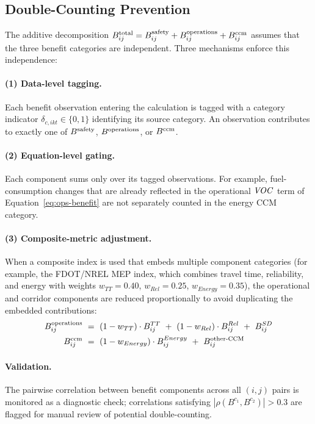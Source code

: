 \subsection{Double-Counting Prevention}

The additive decomposition $B^{\mathrm{total}}_{ij} = B^{\mathrm{safety}}_{ij} + B^{\mathrm{operations}}_{ij} +
B^{\mathrm{ccm}}_{ij}$ assumes that the three benefit categories are independent. Three
mechanisms enforce this independence:

\paragraph{(1) Data-level tagging.} Each benefit observation entering the
calculation is tagged with a category indicator
$\delta_{c,ikt} \in \{0, 1\}$ identifying its source category. An observation
contributes to exactly one of $B^{\mathrm{safety}}$, $B^{\mathrm{operations}}$, or $B^{\mathrm{ccm}}$.

\paragraph{(2) Equation-level gating.} Each component sums only over its
tagged observations. For example, fuel-consumption changes that are already
reflected in the operational $\mathit{VOC}$ term of Equation~\ref{eq:ops-benefit}
are not separately counted in the energy CCM category.

\paragraph{(3) Composite-metric adjustment.} When a composite index is used
that embeds multiple component categories (for example, the FDOT/NREL MEP
index, which combines travel time, reliability, and energy with weights
$w_{TT} = 0.40$, $w_{Rel} = 0.25$, $w_{Energy} = 0.35$), the operational and
corridor components are reduced proportionally to avoid duplicating the
embedded contributions:
\begin{align*}
B^{\mathrm{operations}}_{ij} \ &=\ (1 - w_{TT}) \cdot B_{ij}^{TT}
            \ +\ (1 - w_{Rel}) \cdot B_{ij}^{Rel}
            \ +\ B_{ij}^{SD} \\
B^{\mathrm{ccm}}_{ij} \ &=\ (1 - w_{Energy}) \cdot B_{ij}^{Energy}
            \ +\ B_{ij}^{\text{other-CCM}}
\end{align*}

\paragraph{Validation.} The pairwise correlation between benefit components
across all $(i, j)$ pairs is monitored as a diagnostic check; correlations
satisfying $|\rho(B^{c_1}, B^{c_2})| > 0.3$ are flagged for manual review of
potential double-counting.

